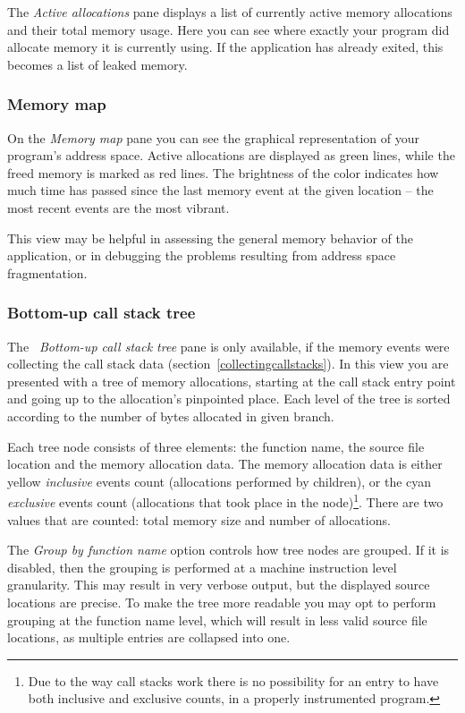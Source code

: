 \documentclass[hidelinks,titlepage,a4paper]{article}
\begin{document}
The \emph{\faHeartbeat{} Active allocations} pane displays a list of currently active memory allocations and their total memory usage. Here you can see where exactly your program did allocate memory it is currently using. If the application has already exited, this becomes a list of leaked memory.

\subsubsection{Memory map}

On the \emph{\faMap{} Memory map} pane you can see the graphical representation of your program's address space. Active allocations are displayed as green lines, while the freed memory is marked as red lines. The brightness of the color indicates how much time has passed since the last memory event at the given location -- the most recent events are the most vibrant.

This view may be helpful in assessing the general memory behavior of the application, or in debugging the problems resulting from address space fragmentation.

\subsubsection{Bottom-up call stack tree}
\label{callstacktree}

The \emph{\faAlignJustify{}~Bottom-up call stack tree} pane is only available, if the memory events were collecting the call stack data (section~\ref{collectingcallstacks}). In this view you are presented with a tree of memory allocations, starting at the call stack entry point and going up to the allocation's pinpointed place. Each level of the tree is sorted according to the number of bytes allocated in given branch.

Each tree node consists of three elements: the function name, the source file location and the memory allocation data. The memory allocation data is either yellow \emph{inclusive} events count (allocations performed by children), or the cyan \emph{exclusive} events count (allocations that took place in the node)\footnote{Due to the way call stacks work there is no possibility for an entry to have both inclusive and exclusive counts, in a properly instrumented program.}. There are two values that are counted: total memory size and number of allocations.

The \emph{Group by function name} option controls how tree nodes are grouped. If it is disabled, then the grouping is performed at a machine instruction level granularity. This may result in very verbose output, but the displayed source locations are precise. To make the tree more readable you may opt to perform grouping at the function name level, which will result in less valid source file locations, as multiple entries are collapsed into one.
\end{document}
